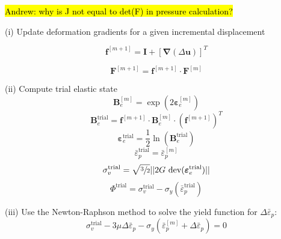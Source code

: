 \documentclass[sn-mathphys,Numbered,draft]{sn-jnl}%
\newcommand{\bb}{\boldsymbol}
\begin{document}
\hl{Andrew: why is J not equal to det(F) in pressure calculation?}\\
\begin{algorithm}[htb] \label{alg:stressAlg}
\SetAlgoLined
(i) Update deformation gradients for a given incremental displacement

\begin{equation}
  \mathbf{f}^{[m+1]} = \mathbf{I} + \left[ \bb{\nabla}(\Delta\textbf{u}) \right]^T \nonumber
\end{equation}

\begin{equation}
  \mathbf{F}^{[m+1]} = \mathbf{f}^{[m+1]} \cdot \mathbf{F}^{[m]}  \nonumber
\end{equation}

(ii) Compute trial elastic state
\begin{equation}
\mathbf{B}_{e}^{[m]} = \exp\left({2\boldsymbol{\varepsilon}_{e}^{[m]}}\right) \nonumber
\end{equation}
\begin{equation}
\mathbf{B}_{e}^{\text{trial}} = \mathbf{f}^{[m+1]} \cdot \mathbf{B}_{e}^{[m]} \cdot (\mathbf{f}^{[m+1]})^{T}\nonumber
\end{equation}
\begin{equation}
\boldsymbol{\varepsilon}_{e}^{\text{trial}} = \frac{1}{2} \ln(\textbf{B}_{e}^{\text{trial}}) \nonumber
\end{equation}
\begin{equation}
\bar{\varepsilon}^{\text{trial}}_p = \bar{\varepsilon}^{[m]}_p \nonumber
\end{equation}
\begin{equation}
\sigma_{v}^{\text{trial}} = \sqrt{\sfrac{3}{2}} || 2G\ \text{dev}(\boldsymbol{\varepsilon}_{e}^{\text{trial}})|| \nonumber
\end{equation}
\begin{equation}
\Phi^{\text{trial}} =  \sigma_{v}^{\text{trial}} - \sigma_{y}(\bar{\varepsilon}^{\text{trial}}_p) \nonumber 
\end{equation}

(iii) Use the Newton-Raphson method to solve the yield function for $\Delta\bar{\varepsilon}_p$:
\begin{equation}
	\sigma_{v}^{\text{trial}} 
	- 3\mu \Delta\bar{\varepsilon}_p
	-\sigma_{y}(\bar{\varepsilon}^{[m]}_p + \Delta\bar{\varepsilon}_p) = 0 \nonumber
\end{equation}


\end{algorithm}
\end{document}
